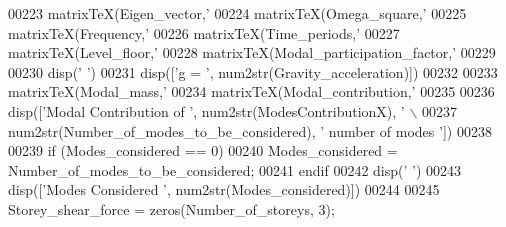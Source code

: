 \begin{DoxyCode}
{{{{{{{{{{{{{{{{{{{{{{{{{{{{{{00223 \textcolor{stringliteral}{matrixTeX(Eigen\_vector,'}%
00224 \textcolor{stringliteral}{matrixTeX(Omega\_square,'}%
00225 \textcolor{stringliteral}{matrixTeX(Frequency,'}%
00226 \textcolor{stringliteral}{matrixTeX(Time\_periods,'}%
00227 \textcolor{stringliteral}{matrixTeX(Level\_floor,'}%
00228 \textcolor{stringliteral}{matrixTeX(Modal\_participation\_factor,'}%
00229 \textcolor{stringliteral}{}
00230 \textcolor{stringliteral}{disp('} \textcolor{stringliteral}{')}
00231 \textcolor{stringliteral}{disp(['}g = \textcolor{stringliteral}{', num2str(Gravity\_acceleration)])}
00232 \textcolor{stringliteral}{}
00233 \textcolor{stringliteral}{matrixTeX(Modal\_mass,'}%
00234 \textcolor{stringliteral}{matrixTeX(Modal\_contribution,'}%
00235 \textcolor{stringliteral}{}
00236 \textcolor{stringliteral}{disp(['}Modal Contribution of \textcolor{stringliteral}{', num2str(ModesContributionX), '} \(\backslash\)%
00237 \textcolor{stringliteral}{  num2str(Number\_of\_modes\_to\_be\_considered), '} number of modes \textcolor{stringliteral}{'])}
00238 \textcolor{stringliteral}{}
00239 \textcolor{stringliteral}{if (Modes\_considered == 0)}
00240 \textcolor{stringliteral}{  Modes\_considered = Number\_of\_modes\_to\_be\_considered;}
00241 \textcolor{stringliteral}{endif}
00242 \textcolor{stringliteral}{disp('} \textcolor{stringliteral}{')}
00243 \textcolor{stringliteral}{disp(['}Modes Considered \textcolor{stringliteral}{', num2str(Modes\_considered)])}
00244 \textcolor{stringliteral}{}
00245 \textcolor{stringliteral}{Storey\_shear\_force = zeros(Number\_of\_storeys, 3);}
}}}}}}}}}}}}}}}}}}}}}}}}}}}}}}
\end{DoxyCode}
